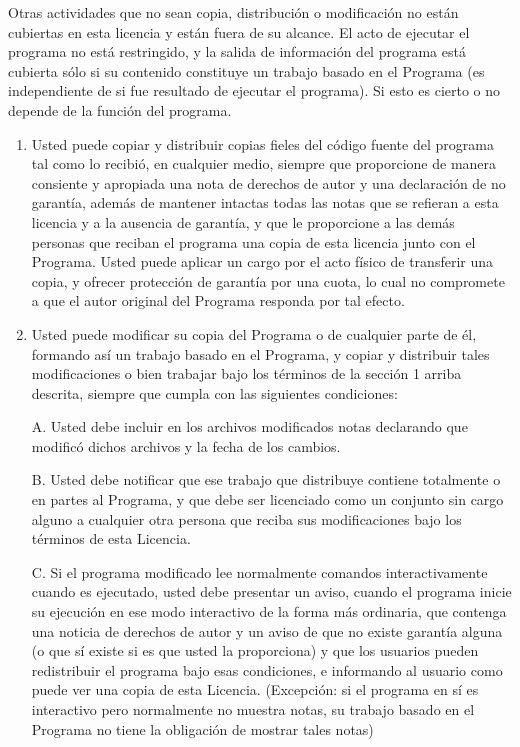 Otras actividades que no sean copia, distribución o modificación no están cubiertas en esta licencia y están fuera de su alcance. El acto de ejecutar el programa no está restringido, y la salida de información del programa está cubierta sólo si su contenido constituye un trabajo basado en el Programa (es independiente de si fue resultado de ejecutar el programa). Si esto es cierto o no depende de la función del programa. 

\begin{enumerate}
\item Usted puede copiar y distribuir copias fieles del código fuente del programa tal como lo recibió, en cualquier medio, siempre que proporcione de manera consiente y apropiada una nota de derechos de autor y una declaración de no garantía, además de mantener intactas todas las notas que se refieran a esta licencia y a la ausencia de garantía, y que le proporcione a las demás personas que reciban el programa una copia de esta licencia junto con el Programa. 
Usted puede aplicar un cargo por el acto físico de transferir una copia, y ofrecer protección de garantía por una cuota, lo cual no compromete a que el autor original del Programa responda por tal efecto. 

\item Usted puede modificar su copia del Programa o de cualquier parte de él, formando así un trabajo basado en el Programa, y copiar y distribuir tales modificaciones o bien trabajar bajo los términos de la sección 1 arriba descrita, siempre que cumpla con las siguientes condiciones: 

A. Usted debe incluir en los archivos modificados notas declarando que modificó dichos archivos y la fecha de los cambios. 

B. Usted debe notificar que ese trabajo que distribuye contiene totalmente o en partes al Programa, y que debe ser licenciado como un conjunto sin cargo alguno a cualquier otra persona que reciba sus modificaciones bajo los términos de esta Licencia. 

C. Si el programa modificado lee normalmente comandos interactivamente cuando es ejecutado, usted debe presentar un aviso, cuando el programa inicie su ejecución en ese modo interactivo de la forma más ordinaria, que contenga una noticia de derechos de autor y un aviso de que no existe garantía alguna (o que sí existe si es que usted la proporciona) y que los usuarios pueden redistribuir el programa bajo esas condiciones, e informando al usuario como puede ver una copia de esta Licencia. (Excepción: si el programa en sí es interactivo pero normalmente no muestra notas, su trabajo basado en el Programa no tiene la obligación de mostrar tales notas) 


\end{enumerate}
